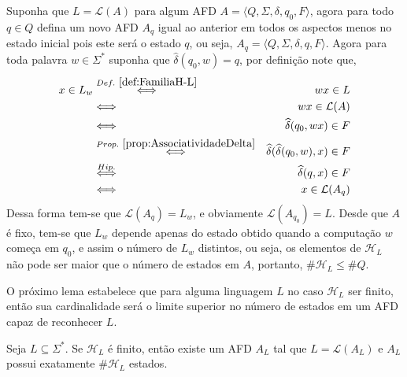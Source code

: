 \begin{prova}
	Suponha que $L = \mathcal{L}(A)$ para algum AFD $A = \langle Q, \Sigma, \delta, q_0, F\rangle$, agora para todo $q \in Q$ defina um novo AFD $A_q$ igual ao anterior em todos os aspectos menos no estado inicial pois este será o estado $q$, ou seja,  $A_q = \langle Q, \Sigma, \delta, q, F\rangle$. Agora para toda palavra $w \in \Sigma^*$ suponha que $\widehat{\delta}(q_0, w) = q$, por definição note que, 
	\begin{eqnarray*}
		x \in L_w & \stackrel{Def. \ \ref{def:FamiliaH-L}}{\Longleftrightarrow} & wx \in L\\
		& \Longleftrightarrow & wx \in \mathcal{L}(A)\\
		& \Longleftrightarrow & \widehat{\delta}(q_0, wx) \in F\\
		& \stackrel{Prop. \ \ref{prop:AssociatividadeDelta}}{\Longleftrightarrow} & \widehat{\delta}(\widehat{\delta}(q_0, w), x) \in F\\
		& \stackrel{Hip.}{\Longleftrightarrow} & \widehat{\delta}(q, x) \in F\\
		& \Longleftrightarrow & x \in \mathcal{L}(A_q)
	\end{eqnarray*}
	Dessa forma tem-se que $\mathcal{L}(A_q) = L_w$, e obviamente $\mathcal{L}(A_{q_0}) = L$. Desde que  $A$ é fixo, tem-se que $L_w$ depende apenas do estado obtido quando a computação $w$ começa em $q_0$, e assim o número de $L_w$ distintos, ou seja, os elementos de $\mathcal{H}_L$ não pode ser maior que o número de estados em $A$, portanto, $\#\mathcal{H}_L \leq \# Q$.
\end{prova}

O próximo lema estabelece que para alguma linguagem $L$ no caso $\mathcal{H}_L$ ser finito, então sua cardinalidade será o limite superior no número de estados em um AFD capaz de reconhecer $L$.

\begin{lema}\label{lema:LimiteSuperiorEstados}
	Seja $L \subseteq \Sigma^*$. Se $\mathcal{H}_L$ é finito, então existe um AFD $A _L$ tal que $L = \mathcal{L}(A_L)$ e $A_L$ possui exatamente $\#\mathcal{H}_L$ estados.
\end{lema}


